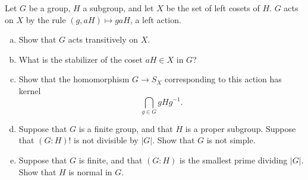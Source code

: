 \documentclass[10pt]{article}
\providecommand{\ii}{\item}
\providecommand{\inv}{^{-1}}
\providecommand{\abs}[1]{\left|#1\right|}
\begin{document}
\begin{problem}
    Let $G$ be a group, $H$ a subgroup, and let $X$ be the set of
    left cosets of $H$. $G$ acts on $X$ by the rule
    $(g,aH)\mapsto gaH$, a left action.
    \begin{enumerate}[(a)]
        \ii Show that $G$ acts transitively on $X$.
	\ii What is the stabilizer of the coset $aH\in X$ in $G$?
	\ii Show that the homomorphism $G\to S_X$
	corresponding to this action has kernel
	\begin{equation*}
	    \bigcap_{g\in G}gHg\inv.
	\end{equation*}
	\ii Suppose that $G$ is a finite group, and that
	$H$ is a proper subgroup. Suppose that $(G:H)!$ is
	not divisible by $|G|$. Show that $G$ is not simple.
	\ii Suppose that $G$ is finite, and that $(G:H)$ is
	the smallest prime dividing $\abs G$.
	Show that $H$ is normal in $G$.
    \end{enumerate}
\end{problem}
\end{document}
